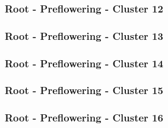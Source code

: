 \clearpage

\subsubsection{Root - Preflowering - Cluster 12}

\vspace{1em}



\clearpage

\subsubsection{Root - Preflowering - Cluster 13}

\vspace{1em}



\clearpage

\subsubsection{Root - Preflowering - Cluster 14}

\vspace{1em}



\clearpage

\subsubsection{Root - Preflowering - Cluster 15}

\vspace{1em}



\clearpage

\subsubsection{Root - Preflowering - Cluster 16}

\vspace{1em}



\clearpage

